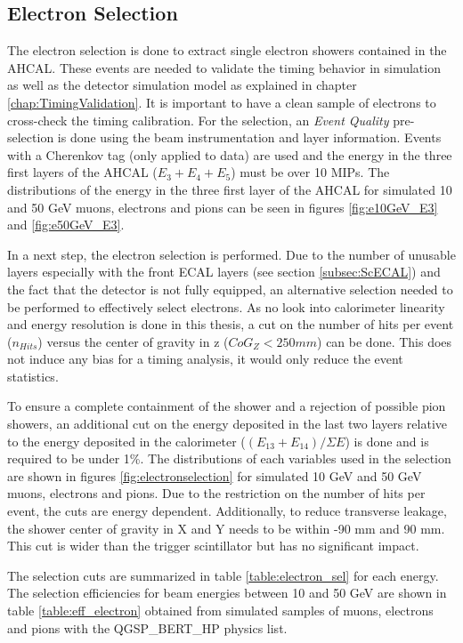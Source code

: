 \subsection{Electron Selection}
\label{subsec:elec_sel}

The electron selection is done to extract single electron showers contained in the AHCAL. These events are needed to validate the timing behavior in simulation as well as the detector simulation model as explained in chapter \ref{chap:TimingValidation}. It is important to have a clean sample of electrons to cross-check the timing calibration. For the selection, an \textit{Event Quality} pre-selection is done using the beam instrumentation and layer information. Events with a Cherenkov tag (only applied to data) are used and the energy in the three first layers of the AHCAL ($E_3+E_4+E_5$) must be over 10 MIPs. The distributions of the energy in the three first layer of the AHCAL for simulated 10 and 50 GeV muons, electrons and pions can be seen in figures \ref{fig:e10GeV_E3} and \ref{fig:e50GeV_E3}.

In a next step, the electron selection is performed. Due to the number of unusable layers especially with the front ECAL layers (see section \ref{subsec:ScECAL}) and the fact that the detector is not fully equipped, an alternative selection needed to be performed to effectively select electrons. As no look into calorimeter linearity and energy resolution is done in this thesis, a cut on the number of hits per event ($n_{Hits}$) versus the center of gravity in z ($CoG_Z < 250 mm$) can be done. This does not induce any bias for a timing analysis, it would only reduce the event statistics.

To ensure a complete containment of the shower and a rejection of possible pion showers, an additional cut on the energy deposited in the last two layers relative to the energy deposited in the calorimeter ($(E_{13}+E_{14})/\Sigma E$) is done and is required to be under 1\%. The distributions of each variables used in the selection are shown in figures \ref{fig:electronselection} for simulated 10 GeV and 50 GeV muons, electrons and pions. Due to the restriction on the number of hits per event, the cuts are energy dependent. Additionally, to reduce transverse leakage, the shower center of gravity in X and Y needs to be within -90 mm and 90 mm. This cut is wider than the trigger scintillator but has no significant impact.

The selection cuts are summarized in table \ref{table:electron_sel} for each energy. The selection efficiencies for beam energies between 10 and 50 GeV are shown in table \ref{table:eff_electron} obtained from simulated samples of muons, electrons and pions with the QGSP\_BERT\_HP physics list.

